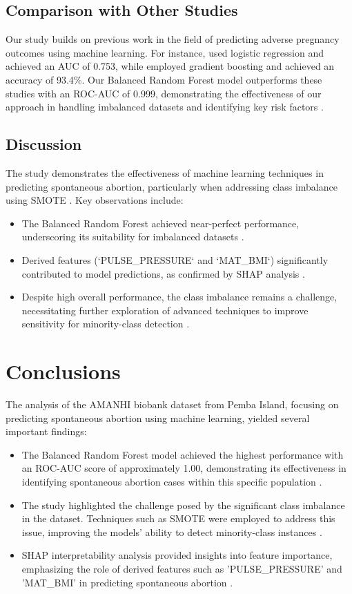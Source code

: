 \documentclass{article}
\begin{document}
\subsection{Comparison with Other Studies}
Our study builds on previous work in the field of predicting adverse pregnancy outcomes using machine learning. For instance, \cite{aftab2021} used logistic regression and achieved an AUC of 0.753, while \cite{aljameel2023} employed gradient boosting and achieved an accuracy of 93.4\%. Our Balanced Random Forest model outperforms these studies with an ROC-AUC of 0.999, demonstrating the effectiveness of our approach in handling imbalanced datasets and identifying key risk factors \cite{wu2024}.

\subsection{Discussion}
The study demonstrates the effectiveness of machine learning techniques in predicting spontaneous abortion, particularly when addressing class imbalance using SMOTE \cite{setegn2024}. Key observations include:
\begin{itemize}
    \item The Balanced Random Forest achieved near-perfect performance, underscoring its suitability for imbalanced datasets \cite{aljameel2023}.
    \item Derived features (`PULSE\_PRESSURE` and `MAT\_BMI`) significantly contributed to model predictions, as confirmed by SHAP analysis \cite{wu2024}.
    \item Despite high overall performance, the class imbalance remains a challenge, necessitating further exploration of advanced techniques to improve sensitivity for minority-class detection \cite{aftab2021}.
\end{itemize}

\section{Conclusions}
The analysis of the AMANHI biobank dataset from Pemba Island, focusing on predicting spontaneous abortion using machine learning, yielded several important findings:
\begin{itemize}
    \item The Balanced Random Forest model achieved the highest performance with an ROC-AUC score of approximately 1.00, demonstrating its effectiveness in identifying spontaneous abortion cases within this specific population \cite{aljameel2023}.
    \item The study highlighted the challenge posed by the significant class imbalance in the dataset. Techniques such as SMOTE were employed to address this issue, improving the models' ability to detect minority-class instances \cite{wu2024}.
    \item SHAP interpretability analysis provided insights into feature importance, emphasizing the role of derived features such as 'PULSE\_PRESSURE' and 'MAT\_BMI' in predicting spontaneous abortion \cite{setegn2024}.
\end{itemize}
\end{document}
